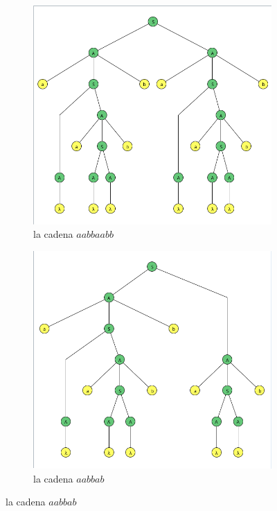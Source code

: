 \documentclass{article}
\begin{document}
\begin{flushleft}
\begin{enumerate}
\begin{figure}[h]
\begin{subfigure}[b]{0.45\textwidth}
                        \includegraphics[width=\textwidth]{./Imagenes/grado4.png}
                        \caption{la cadena $aabbaabb$}
                        \label{fig:label12}
                    \end{subfigure}
                    \hfill
                    \begin{subfigure}[b]{0.45\textwidth}
                        \centering
                        \includegraphics[width=\textwidth]{./Imagenes/grafo5.png}
                        \caption{la cadena $aabbab$}
                        \label{fig:label13}
                    \end{subfigure}
                    \label{fig:matrix3}
                \end{figure}

            \end{enumerate}
        \end{flushleft}
\end{document}
